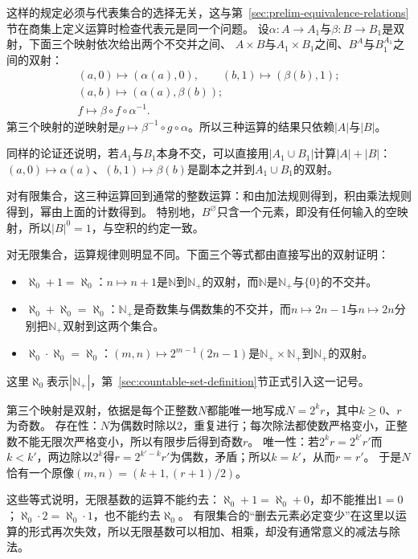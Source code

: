 这样的规定必须与代表集合的选择无关，这与第~\ref{sec:prelim-equivalence-relations}节在商集上定义运算时检查代表元是同一个问题。
设$\alpha:A\to A_1$与$\beta:B\to B_1$是双射，下面三个映射依次给出两个不交并之间、
$A\times B$与$A_1\times B_1$之间、$B^A$与$B_1^{A_1}$之间的双射：
\[
 \begin{gathered}
  (a,0)\mapsto(\alpha(a),0),\qquad (b,1)\mapsto(\beta(b),1);\\
  (a,b)\mapsto(\alpha(a),\beta(b));\\
  f\mapsto\beta\circ f\circ\alpha^{-1}.
 \end{gathered}
\]
第三个映射的逆映射是$g\mapsto\beta^{-1}\circ g\circ\alpha$。所以三种运算的结果只依赖$|A|$与$|B|$。

同样的论证还说明，若$A_1$与$B_1$本身不交，可以直接用$|A_1\cup B_1|$计算$|A|+|B|$：$(a,0)\mapsto\alpha(a)$、$(b,1)\mapsto\beta(b)$是副本之并到$A_1\cup B_1$的双射。

对有限集合，这三种运算回到通常的整数运算：和由加法规则得到，积由乘法规则得到，幂由上面的计数得到。
特别地，$B^\varnothing$只含一个元素，即没有任何输入的空映射，所以$|B|^0=1$，与空积的约定一致。

对无限集合，运算规律则明显不同。下面三个等式都由直接写出的双射证明：
\begin{itemize}
 \item $\aleph_0+1=\aleph_0$：$n\mapsto n+1$是$\mathbb N$到$\mathbb N_+$的双射，而$\mathbb N$是$\mathbb N_+$与$\{0\}$的不交并。
 \item $\aleph_0+\aleph_0=\aleph_0$：$\mathbb N_+$是奇数集与偶数集的不交并，而$n\mapsto2n-1$与$n\mapsto2n$分别把$\mathbb N_+$双射到这两个集合。
 \item $\aleph_0\cdot\aleph_0=\aleph_0$：$(m,n)\mapsto2^{m-1}(2n-1)$是$\mathbb N_+\times\mathbb N_+$到$\mathbb N_+$的双射。
\end{itemize}
这里$\aleph_0$表示$|\mathbb N_+|$，第~\ref{sec:countable-set-definition}节正式引入这一记号。

第三个映射是双射，依据是每个正整数$N$都能唯一地写成$N=2^kr$，其中$k\geq0$、$r$为奇数。
存在性：$N$为偶数时除以$2$，重复进行；每次除法都使数严格变小，正整数不能无限次严格变小，所以有限步后得到奇数$r$。
唯一性：若$2^kr=2^{k'}r'$而$k<k'$，两边除以$2^k$得$r=2^{k'-k}r'$为偶数，矛盾；所以$k=k'$，从而$r=r'$。
于是$N$恰有一个原像$(m,n)=(k+1,(r+1)/2)$。

这些等式说明，无限基数的运算不能约去：$\aleph_0+1=\aleph_0+0$，却不能推出$1=0$；$\aleph_0\cdot2=\aleph_0\cdot1$，也不能约去$\aleph_0$。
有限集合的“删去元素必定变少”在这里以运算的形式再次失效，所以无限基数可以相加、相乘，却没有通常意义的减法与除法。


